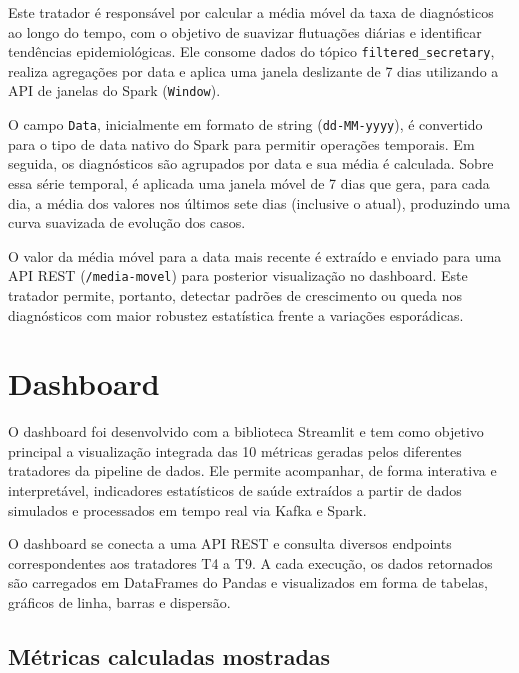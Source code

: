 \documentclass[a4paper,12pt]{article}
\begin{document}
Este tratador é responsável por calcular a média móvel da taxa de diagnósticos ao longo do tempo, com o objetivo de suavizar flutuações diárias e identificar tendências epidemiológicas. Ele consome dados do tópico \texttt{filtered\_secretary}, realiza agregações por data e aplica uma janela deslizante de 7 dias utilizando a API de janelas do Spark (\texttt{Window}).

O campo \texttt{Data}, inicialmente em formato de string (\texttt{dd-MM-yyyy}), é convertido para o tipo de data nativo do Spark para permitir operações temporais. Em seguida, os diagnósticos são agrupados por data e sua média é calculada. Sobre essa série temporal, é aplicada uma janela móvel de 7 dias que gera, para cada dia, a média dos valores nos últimos sete dias (inclusive o atual), produzindo uma curva suavizada de evolução dos casos.

O valor da média móvel para a data mais recente é extraído e enviado para uma API REST (\texttt{/media-movel}) para posterior visualização no dashboard. Este tratador permite, portanto, detectar padrões de crescimento ou queda nos diagnósticos com maior robustez estatística frente a variações esporádicas.




\section{Dashboard}

O dashboard foi desenvolvido com a biblioteca Streamlit e tem como objetivo principal a visualização integrada das 10 métricas geradas pelos diferentes tratadores da pipeline de dados. Ele permite acompanhar, de forma interativa e interpretável, indicadores estatísticos de saúde extraídos a partir de dados simulados e processados em tempo real via Kafka e Spark.

O dashboard se conecta a uma API REST  e consulta diversos endpoints correspondentes aos tratadores T4 a T9. A cada execução, os dados retornados são carregados em DataFrames do Pandas e visualizados em forma de tabelas, gráficos de linha, barras e dispersão.


\subsection*{Métricas calculadas mostradas}
\end{document}
